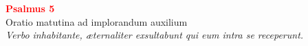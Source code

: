 


\def\greinitialformat#1{%
{\fontsize{39}{39}\selectfont #1}%
}




\vspace{0.3cm}
\begin{center}
 \textcolor{red}{\large \bf Psalmus 5}\\
Oratio matutina ad implorandum auxilium\\
\textit{\small Verbo inhabitante, æternaliter exsultabunt qui eum intra se receperunt.}
\end{center}
